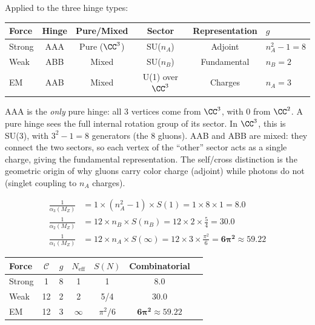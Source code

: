 Applied to the three hinge types:
\begin{center}
\begin{tabular}{lccccl}
\hline
Force & Hinge & Pure/Mixed & Sector & Representation & $g$ \\
\hline
Strong & AAA & Pure ($\CC^3$) & SU($n_A$) & Adjoint & $n_A^2 - 1 = 8$ \\
Weak & ABB & Mixed & SU($n_B$) & Fundamental & $n_B = 2$ \\
EM & AAB & Mixed & U(1) over $\CC^3$ & Charges & $n_A = 3$ \\
\hline
\end{tabular}
\end{center}

\begin{remark}
AAA is the \emph{only} pure hinge: all 3 vertices come from $\CC^3$, with 0 from $\CC^2$. A pure hinge sees the full internal rotation group of its sector. In $\CC^3$, this is SU(3), with $3^2 - 1 = 8$ generators (the 8 gluons). AAB and ABB are mixed: they connect the two sectors, so each vertex of the ``other'' sector acts as a single charge, giving the fundamental representation. The self/cross distinction is the geometric origin of why gluons carry color charge (adjoint) while photons do not (singlet coupling to $n_A$ charges).
\end{remark}

\begin{theorem}
\label{thm:couplings}
\begin{align}
\frac{1}{\alpha_3(M_Z)} &= 1 \times (n_A^2 - 1) \times S(1) = 1 \times 8 \times 1 = \mathbf{8.0} \label{eq:alpha3} \\
\frac{1}{\alpha_2(M_Z)} &= 12 \times n_B \times S(n_B) = 12 \times 2 \times \frac{5}{4} = \mathbf{30.0} \label{eq:alpha2} \\
\frac{1}{\alpha_1(M_Z)} &= 12 \times n_A \times S(\infty) = 12 \times 3 \times \frac{\pi^2}{6} = \mathbf{6\pi^2} \approx 59.22 \label{eq:alpha1}
\end{align}
\end{theorem}

\begin{center}
\begin{tabular}{lcccccc}
\hline
Force & $\mathcal{C}$ & $g$ & $N_\text{eff}$ & $S(N)$ & Combinatorial \\
\hline
Strong & 1 & 8 & 1 & 1 & $\mathbf{8.0}$ \\
Weak & 12 & 2 & 2 & 5/4 & $\mathbf{30.0}$ \\
EM & 12 & 3 & $\infty$ & $\pi^2/6$ & $\mathbf{6\pi^2} \approx 59.22$ \\
\hline
\end{tabular}
\end{center}


